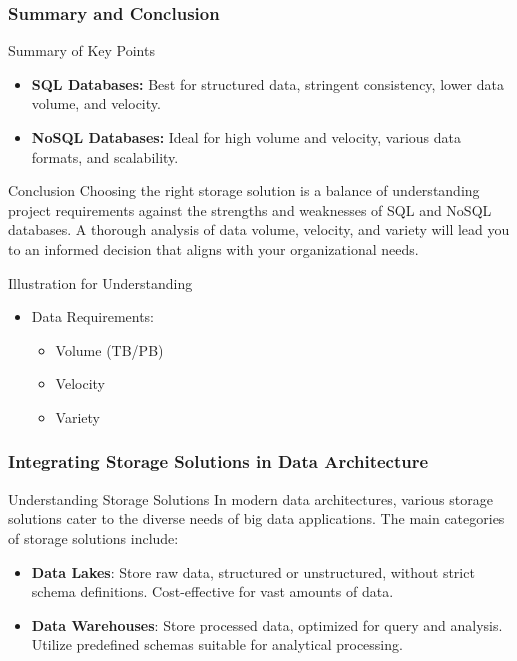 \documentclass[aspectratio=169]{beamer}
\begin{document}
\begin{frame}[fragile]
    \frametitle{Summary and Conclusion}
    \begin{block}{Summary of Key Points}
        \begin{itemize}
            \item \textbf{SQL Databases:} Best for structured data, stringent consistency, lower data volume, and velocity.
            \item \textbf{NoSQL Databases:} Ideal for high volume and velocity, various data formats, and scalability.
        \end{itemize}
    \end{block}
    
    \begin{block}{Conclusion}
        Choosing the right storage solution is a balance of understanding project requirements against the strengths and weaknesses of SQL and NoSQL databases. A thorough analysis of data volume, velocity, and variety will lead you to an informed decision that aligns with your organizational needs.
    \end{block}
    
    \begin{block}{Illustration for Understanding}
        \begin{itemize}
            \item Data Requirements:
                \begin{itemize}
                    \item Volume (TB/PB)
                    \item Velocity
                    \item Variety
                \end{itemize}
        \end{itemize}
    \end{block}
\end{frame}

\begin{frame}[fragile]
    \frametitle{Integrating Storage Solutions in Data Architecture}
    \begin{block}{Understanding Storage Solutions}
        In modern data architectures, various storage solutions cater to the diverse needs of big data applications. The main categories of storage solutions include:
    \end{block}
    \begin{itemize}
        \item \textbf{Data Lakes}: Store raw data, structured or unstructured, without strict schema definitions. Cost-effective for vast amounts of data.
        \item \textbf{Data Warehouses}: Store processed data, optimized for query and analysis. Utilize predefined schemas suitable for analytical processing.
    \end{itemize}
\end{frame}
\end{document}

